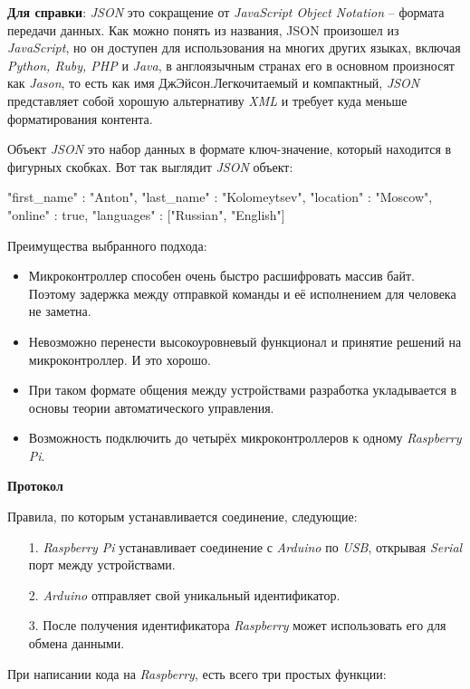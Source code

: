 \textbf{Для справки}: \textit{JSON} это сокращение от \textit{JavaScript Object Notation} -- формата передачи данных. Как можно понять из названия, {JSON} произошел из \textit{JavaScript}, но он доступен для использования на многих других языках, включая \textit{Python, Ruby, PHP} и \textit{Java}, в англоязычным странах его в основном произносят как \textit{Jason}, то есть как имя ДжЭйсон.Легкочитаемый и компактный, \textit{JSON} представляет собой хорошую альтернативу \textit{XML} и требует куда меньше форматирования контента.

\noindent Объект \textit{JSON} это набор данных в формате ключ-значение, который находится в фигурных скобках.
Вот так выглядит \textit{JSON} объект:
\begin{code}
{
  "first_name" : "Anton",
  "last_name" : "Kolomeytsev",
  "location" : "Moscow",
  "online" : true,
  "languages" : ["Russian", "English"] 
}
\end{code}

Преимущества выбранного подхода:
\begin{itemize}
    \item Микроконтроллер способен очень быстро расшифровать массив байт. Поэтому задержка между отправкой команды и её исполнением для человека не заметна.
    \item Невозможно перенести высокоуровневый функционал и принятие решений на микроконтроллер. И это хорошо.
    \item При таком формате общения между устройствами разработка  укладывается в основы теории автоматического управления.
    \item Возможность подключить до четырёх микроконтроллеров к одному \textit{Raspberry Pi}.
\end{itemize}

\textbf{Протокол}

Правила, по которым устанавливается соединение, следующие:
\begin{itemize}
    \item[1.] \textit{Raspberry Pi} устанавливает соединение с \textit{Arduino} по \textit{USB}, открывая \textit{Serial} порт между устройствами.
    \item[2.] \textit{Arduino} отправляет свой уникальный идентификатор.
    \item[3.] После получения идентификатора \textit{Raspberry} может использовать его для обмена данными. 
\end{itemize}

При написании кода на \textit{Raspberry}, есть всего три простых функции:

